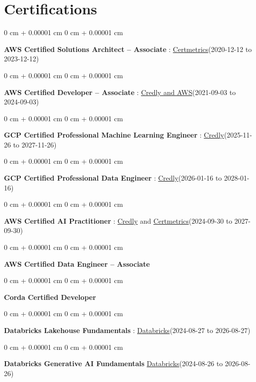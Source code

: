 \documentclass[10pt, letterpaper]{article}
\newenvironment{onecolentry}{
    \begin{adjustwidth}{
        0 cm + 0.00001 cm
    }{
        0 cm + 0.00001 cm
    }
}{
    \end{adjustwidth}
} %
\begin{document}
    \vspace{2 pt }
    \section{Certifications}
        \vspace{2 pt }
        \begin{samepage}
            \begin{onecolentry}
                \textbf{AWS Certified Solutions Architect – Associate} : \href{https://cp.certmetrics.com/amazon/en/public/verify/credential/SNBY48EBJJVE1SWX}{Certmetrics}(2020-12-12 to 2023-12-12)
            \end{onecolentry}
            \begin{onecolentry}
                \textbf{AWS Certified Developer – Associate} : \href{https://www.credly.com/badges/b8106fbd-d3d1-4204-8cdf-e708798fd582/public_url}{Credly and AWS}(2021-09-03  to 2024-09-03)
            \end{onecolentry}
            \begin{onecolentry}
                \textbf{GCP Certified Professional Machine Learning Engineer} : \href{https://www.credly.com/badges/a6965347-09ea-4d8f-b398-0e151407160d/public_url}{Credly}(2025-11-26 to 2027-11-26)
            \end{onecolentry}
            \begin{onecolentry}
                \textbf{GCP Certified Professional Data Engineer} : \href{https://www.credly.com/badges/977e96d9-12e7-4f6c-b8a7-df71fb7153b8/public_url}{Credly}(2026-01-16 to 2028-01-16)
            \end{onecolentry}
            \begin{onecolentry}
                \textbf{AWS Certified AI Practitioner} : \href{https://www.credly.com/badges/451b7ba5-8be1-4a8e-bbec-ade26627a6b6/public_url}{Credly} and \href{https://cp.certmetrics.com/amazon/en/public/verify/credential/495f0d9853874bf9a33c17f8e89ce131}{Certmetrics}(2024-09-30 to 2027-09-30)
            \end{onecolentry}
            \begin{onecolentry}
                \textbf{AWS Certified Data Engineer – Associate}
            \end{onecolentry}
            \begin{onecolentry}
                \textbf{Corda Certified Developer}
            \end{onecolentry}
                \begin{onecolentry}
                \textbf{Databricks Lakehouse Fundamentals} : \href{https://scl.io/FXGKS0u}{Databricks}(2024-08-27 to 2026-08-27)
            \end{onecolentry}
            \begin{onecolentry}
                \textbf{Databricks Generative AI Fundamentals} \href{https://sgq.io/3uIFGNi}{Databricks}(2024-08-26 to 2026-08-26)
            \end{onecolentry}
        \end{samepage}
\end{document}
